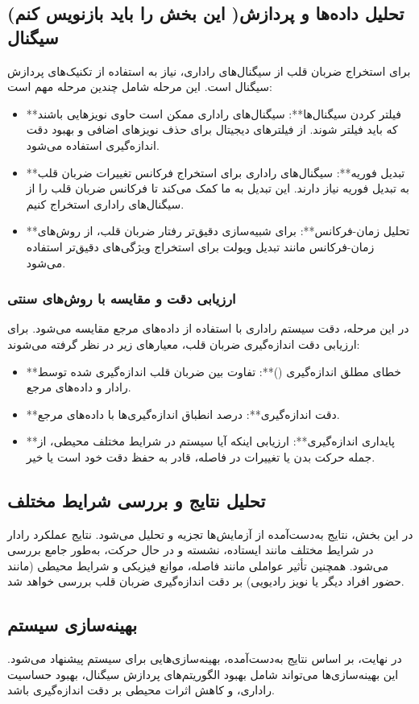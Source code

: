 \subsection{(این بخش را باید بازنویس کنم )تحلیل داده‌ها و پردازش سیگنال} %
\label{sec:data-analysis-signal-processing}
برای استخراج ضربان قلب از سیگنال‌های راداری، نیاز به استفاده از تکنیک‌های پردازش سیگنال است. این مرحله شامل چندین مرحله مهم است:
\begin{itemize}
    \item **فیلتر کردن سیگنال‌ها**: سیگنال‌های راداری ممکن است حاوی نویزهایی باشند که باید فیلتر شوند. از فیلترهای دیجیتال برای حذف نویزهای اضافی و بهبود دقت اندازه‌گیری استفاده می‌شود.
    \item **تبدیل فوریه**: سیگنال‌های راداری برای استخراج فرکانس تغییرات ضربان قلب به تبدیل فوریه نیاز دارند. این تبدیل به ما کمک می‌کند تا فرکانس ضربان قلب را از سیگنال‌های راداری استخراج کنیم.
    \item **تحلیل زمان-فرکانس**: برای شبیه‌سازی دقیق‌تر رفتار ضربان قلب، از روش‌های زمان-فرکانس مانند تبدیل ویولت برای استخراج ویژگی‌های دقیق‌تر استفاده می‌شود.
\end{itemize}

\subsubsection{ارزیابی دقت و مقایسه با روش‌های سنتی} %
\label{sec2}
در این مرحله، دقت سیستم راداری  با استفاده از داده‌های مرجع مقایسه می‌شود. برای ارزیابی دقت اندازه‌گیری ضربان قلب، معیارهای زیر در نظر گرفته می‌شوند:
\begin{itemize}
    \item **خطای مطلق اندازه‌گیری ()**: تفاوت بین ضربان قلب اندازه‌گیری شده توسط رادار  و داده‌های مرجع.
    \item **دقت اندازه‌گیری**: درصد انطباق اندازه‌گیری‌ها با داده‌های مرجع.
    \item **پایداری اندازه‌گیری**: ارزیابی اینکه آیا سیستم در شرایط مختلف محیطی، از جمله حرکت بدن یا تغییرات در فاصله، قادر به حفظ دقت خود است یا خیر.
\end{itemize}

\subsection{تحلیل نتایج و بررسی شرایط مختلف} %
\label{sec:results-analysis}
در این بخش، نتایج به‌دست‌آمده از آزمایش‌ها تجزیه و تحلیل می‌شود. نتایج عملکرد رادار  در شرایط مختلف مانند ایستاده، نشسته و در حال حرکت، به‌طور جامع بررسی می‌شود. همچنین تأثیر عواملی مانند فاصله، موانع فیزیکی و شرایط محیطی (مانند حضور افراد دیگر یا نویز رادیویی) بر دقت اندازه‌گیری ضربان قلب بررسی خواهد شد.

\subsection{بهینه‌سازی سیستم} %
\label{sec:system-optimization}
در نهایت، بر اساس نتایج به‌دست‌آمده، بهینه‌سازی‌هایی برای سیستم پیشنهاد می‌شود. این بهینه‌سازی‌ها می‌تواند شامل بهبود الگوریتم‌های پردازش سیگنال، بهبود حساسیت راداری، و کاهش اثرات محیطی بر دقت اندازه‌گیری باشد.


